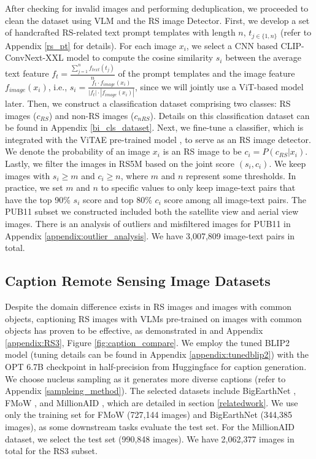 \documentclass[journal]{IEEEtran}
\begin{document}
After checking for invalid images and performing deduplication, we proceeded to clean the dataset using VLM and the RS image Detector. First, we develop a set of handcrafted RS-related text prompt templates with length $n$, $t_{j \in \{1, n\}}$ (refer to Appendix \ref{rs_pt} for details). For each image $x_i$, we select a CNN based CLIP-ConvNext-XXL model \cite{openclip} to compute the cosine similarity $s_i$ between the average text feature $f_{t} = \frac{\sum_{j=1}^{n} f_{text}(t_j)}{n}$ of the prompt templates and the image feature $f_{image}(x_i)$, i.e., $s_i =\frac{f_t \cdot f_{image}(x_i)}{|f_t| \cdot |f_{image}(x_i)| }$, since we will jointly use a ViT-based model later. Then, we construct a classification dataset comprising two classes: RS images ($c_{RS}$) and non-RS images ($c_{nRS}$). Details on this classification dataset can be found in Appendix \ref{bi_cls_dataset}. Next, we fine-tune a classifier, which is integrated with the ViTAE pre-trained model \cite{wang2022advancing}, to serve as an RS image detector. We denote the probability of an image $x_i$ is an RS image to be $c_i = P(c_{RS}| x_i )$. Lastly, we filter the images in RS5M based on the joint score $(s_i, c_i)$. We keep images with $s_i \geq m$ and $c_i \geq n$, where $m$ and $n$ represent some thresholds. In practice, we set $m$ and $n$ to specific values to only keep image-text pairs that have the top 90\% $s_i$ score and top 80\% $c_i$ score among all image-text pairs. The PUB11 subset we constructed included both the satellite view and aerial view images. There is an analysis of outliers and misfiltered images for PUB11 in Appendix \ref{appendix:outlier_analysis}. We have 3,007,809 image-text pairs in total.


\subsection{Caption Remote Sensing Image Datasets}
\label{rs3}

Despite the domain difference exists in RS images and images with common objects, captioning RS images with VLMs pre-trained on images with common objects has proven to be effective, as demonstrated in \cite{blip} and Appendix \ref{appendix:RS3}, Figure \ref{fig:caption_compare}. We employ the tuned BLIP2 model (tuning details can be found in Appendix \ref{appendix:tunedblip2})  \cite{blip2} with the OPT 6.7B checkpoint in half-precision from Huggingface for caption generation. We choose nucleus sampling as it generates more diverse captions (refer to Appendix \ref{sampleing_method}). The selected datasets include BigEarthNet \cite{bigearthnet}, FMoW \cite{fmow}, and MillionAID \cite{millionaid}, which are detailed in section \ref{relatedwork}. We use only the training set for FMoW (727,144 images) and BigEarthNet (344,385 images), as some downstream tasks evaluate the test set. For the MillionAID dataset, we select the test set (990,848 images). We have 2,062,377 images in total for the RS3 subset.
\end{document}
